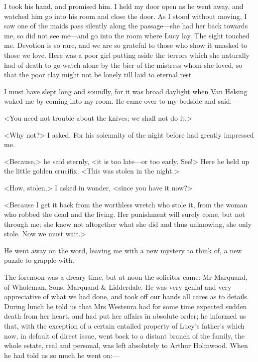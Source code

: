 I took his hand, and promised him. I held my door open as he went away, and watched him go into his room and close the door. As I stood without moving, I saw one of the maids pass silently along the passage—she had her back towards me, so did not see me—and go into the room where Lucy lay. The sight touched me. Devotion is so rare, and we are so grateful to those who show it unasked to those we love. Here was a poor girl putting aside the terrors which she naturally had of death to go watch alone by the bier of the mistress whom she loved, so that the poor clay might not be lonely till laid to eternal rest

 

I must have slept long and soundly, for it was broad daylight when Van Helsing waked me by coming into my room. He came over to my bedside and said:—

<You need not trouble about the knives; we shall not do it.>

<Why not?> I asked. For his solemnity of the night before had greatly impressed me.

<Because,> he said sternly, <it is too late—or too early. See!> Here he held up the little golden crucifix. <This was stolen in the night.>

<How, stolen,> I asked in wonder, <since you have it now?>

<Because I get it back from the worthless wretch who stole it, from the woman who robbed the dead and the living. Her punishment will surely come, but not through me; she knew not altogether what she did and thus unknowing, she only stole. Now we must wait.>

He went away on the word, leaving me with a new mystery to think of, a new puzzle to grapple with.

The forenoon was a dreary time, but at noon the solicitor came: Mr Marquand, of Wholeman, Sons, Marquand \& Lidderdale. He was very genial and very appreciative of what we had done, and took off our hands all cares as to details. During lunch he told us that Mrs Westenra had for some time expected sudden death from her heart, and had put her affairs in absolute order; he informed us that, with the exception of a certain entailed property of Lucy's father's which now, in default of direct issue, went back to a distant branch of the family, the whole estate, real and personal, was left absolutely to Arthur Holmwood. When he had told us so much he went on:—

